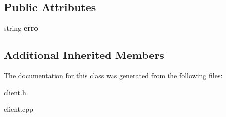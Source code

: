 \subsection*{Public Attributes}
\begin{DoxyCompactItemize}
\item 
\mbox{\label{class_not_a_client_a5a7444300559fedd328e401de04fff79}} 
string {\bfseries erro}
\end{DoxyCompactItemize}
\subsection*{Additional Inherited Members}


The documentation for this class was generated from the following files\+:\begin{DoxyCompactItemize}
\item 
client.\+h\item 
client.\+cpp\end{DoxyCompactItemize}
